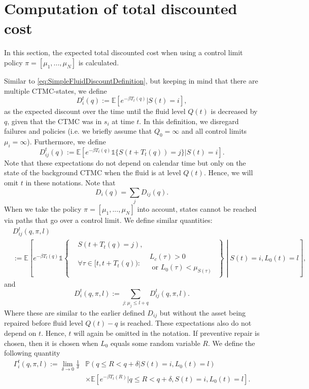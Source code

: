\section{Computation of total discounted cost}
In this section, the expected total discounted cost when using a control limit policy $\pi=[\mu_1,...,\mu_N]$ is calculated.

Similar to \eqref{eq:SimpleFluidDiscountDefinition}, but keeping in mind that there are multiple CTMC-states, we define
\[
D_{i}^t(q):=\mathbb{E}[e^{-\beta T_t(q)}|S(t)=i],
\]
as the expected discount over the time until the fluid level $Q(t)$ is decreased by $q$, given that the CTMC was in $s_i$ at time $t$.
In this definition, we disregard failures and policies (i.e. we briefly assume that $Q_0=\infty$ and all control limits $\mu_i=\infty$).
Furthermore, we define
\[
D_{ij}^t(q):=\mathbb{E}[e^{-\beta T_t(q)}\mathds{1}\{S(t+T_t(q))=j\}|S(t)=i].
\]
Note that these expectations do not depend on calendar time but only on the state of the background CTMC when the fluid is at level $Q(t)$.
Hence, we will omit $t$ in these notations.
Note that
\[
D_{i}(q)=\sum\limits_{j}D_{ij}(q).
\]
When we take the policy $\pi=[\mu_1,...,\mu_N]$ into account, states cannot be reached via paths that go over a control limit.
We define similar quantities:
\[
\begin{split}
&D_{ij}^t(q,\pi,l)\\
&:=\mathbb{E}\left[e^{-\beta T_t(q)}\mathds{1}\left\{\begin{split}
&S(t+T_t(q)=j),\\
&\forall \tau\in[t,t+T_t(q)):
\begin{split}
&L_c(\tau)>0\\&\text{ or } L_0(\tau)<\mu_{S(\tau)}
\end{split}
\end{split}\right\}\middle| S(t)=i,L_0(t)=l\right],
\end{split}
\]
and
\[
D_{i}^t(q,\pi,l):=\sum\limits_{j:\mu_j\leq l+q}D_{ij}^t(q,\pi,l).
\]
Where these are similar to the earlier defined $D_{ij}$ but without the asset being repaired before fluid level $Q(t)-q$ is reached.
These expectations also do not depend on $t$.
Hence, $t$ will again be omitted in the notation.
If preventive repair is chosen, then it is chosen when $L_0$ equals some random variable $R$.
We define the following quantity
\[
\begin{split}
\Gamma_i^t(q,\pi,l):=\lim\limits_{\delta\rightarrow 0}\frac1\delta&\mathbb{P}(q\leq R<q+\delta|S(t)=i,L_0(t)=l)\\
&\times\mathbb{E}[e^{-\beta T_t(R)}|q\leq R<q+\delta,S(t)=i,L_0(t)=l].
\end{split}
\]
